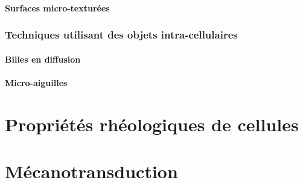 \documentclass{report}
\begin{document}
\paragraph{Surfaces micro-texturées}
\subsubsection{Techniques utilisant des objets intra-cellulaires}
\paragraph{Billes en diffusion}
\paragraph{Micro-aiguilles}


\section{Propriétés rhéologiques de cellules}

\section{Mécanotransduction}
\end{document}

